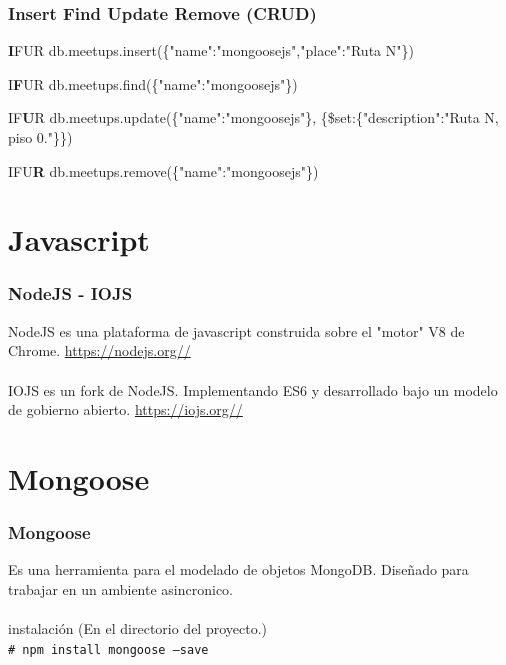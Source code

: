 \documentclass{beamer}
\begin{document}
\begin{frame}
\frametitle{Insert Find Update Remove (CRUD)}
\pause
\begin{block}{\textbf{I}FUR}
db.meetups.insert(\{"name":"mongoosejs","place":"Ruta N"\})
\end{block}
\pause
\begin{block}{I\textbf{F}UR}
db.meetups.find(\{"name":"mongoosejs"\})
\end{block}
\pause
\begin{block}{IF\textbf{U}R}
db.meetups.update(\{"name":"mongoosejs"\},
\{\$set:\{"description":"Ruta N, piso 0."\}\})
\end{block}
\pause
\begin{block}{IFU\textbf{R}}
db.meetups.remove(\{"name":"mongoosejs"\})
\end{block}
\end{frame}

\section{Javascript}
\begin{frame}
\frametitle{NodeJS - IOJS}
NodeJS es una plataforma de javascript construida sobre el "motor" V8 de Chrome.
{\color{blue}\url{https://nodejs.org//}}
\pause
\\~\\
IOJS es un fork de NodeJS. Implementando ES6 y desarrollado bajo un modelo de gobierno abierto.
{\color{blue}\url{https://iojs.org//}}
\end{frame}
\section{Mongoose}
\begin{frame}[fragile]
\frametitle{Mongoose}
Es una herramienta para el modelado de objetos MongoDB. Dise\~nado para trabajar en un ambiente asincronico.
\pause
\\~\\
\newcommand{\shellcmd}[1]{\\\indent\indent\texttt{\footnotesize\# #1}\\}
  \noindent instalaci\'on (En el directorio del proyecto.)
  \shellcmd{npm install mongoose --save}
\end{frame}
\end{document}
